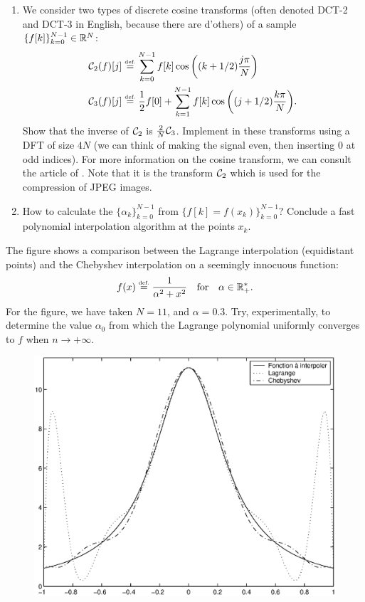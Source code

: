 \begin{exo}
\begin{enumerate}
\item {}   We consider two types of discrete cosine transforms (often denoted DCT-2 and DCT-3 in English, because there are d'others) of a sample $ \{f[k]\}_{k = 0}^{N-1} \in \mathbb{R}^N $:
\begin{align*}
\mathcal{C}_2 (f) [j] & \stackrel{\mbox{\upshape\tiny def.}}{=} \sum_{k = 0}^{N-1}{f[k] \cos \left((k + 1/2) \frac{j \pi}{N } \right)} \\
\mathcal{C}_3 (f) [j] & \stackrel{\mbox{\upshape\tiny def.}}{=} \frac{1}{2} f[0] + \sum_{k = 1}^{N-1}{f[k] \cos \left((j + 1/2) \frac{k \pi}{N} \right)}.
\end{align*}
 Show that the inverse of $ \mathcal{C}_2 $ is $ \frac{2}{N} \mathcal{C}_3 $. Implement in \Matlab{} these transforms using a DFT of size $ 4N $ (we can think of making the signal even, then inserting 0 at odd indices). For more information on the cosine transform, we can consult the article of . Note that it is the transform $ \mathcal{C}_2 $ which is used for the compression of JPEG images.
\item How to calculate the $ \{\alpha_k\}_{k = 0}^{N-1} $ from $ \{f[k] = f(x_k)\}_{k = 0}^{N-1} $? Conclude a fast polynomial interpolation algorithm at the points $ x_k $.
\end{enumerate} The figure  shows a comparison between the Lagrange interpolation (equidistant points) and the Chebyshev interpolation on a seemingly innocuous function:
\begin{equation*}
f(x) \stackrel{\mbox{\upshape\tiny def.}}{=} \frac{1}{\alpha^2 + x^2} \quad \text{for} \quad \alpha \in \mathbb{R}^*_+.
\end{equation*}
For the figure, we have taken $ N = 11 $, and $ \alpha = 0.3 $. Try, experimentally, to determine the value $ \alpha_0 $ from which the Lagrange polynomial uniformly converges to $ f $ when $ n \rightarrow + \infty $. \begin{figure}[ht]
    \begin{center}
    \includegraphics [scale = 0.4]{images/interpolation-chebyshev.eps}

\end{center}
\end{figure}
\end{exo}
